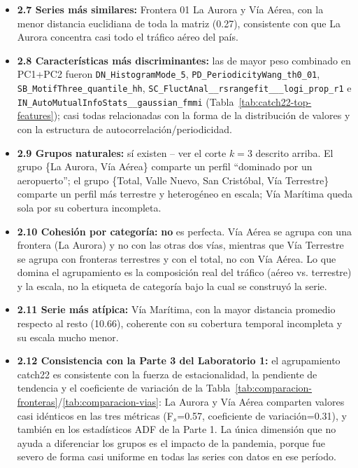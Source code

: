 \documentclass[12pt]{article}
\begin{document}
\begin{itemize}
    \item \textbf{2.7 Series más similares:} Frontera 01 La Aurora y Vía Aérea, con la menor distancia euclidiana de toda la matriz (0.27), consistente con que La Aurora concentra casi todo el tráfico aéreo del país.
    \item \textbf{2.8 Características más discriminantes:} las de mayor peso combinado en PC1+PC2 fueron \texttt{DN\_\allowbreak HistogramMode\_5}, \texttt{PD\_\allowbreak PeriodicityWang\_\allowbreak th0\_01}, \texttt{SB\_\allowbreak MotifThree\_\allowbreak quantile\_hh}, \texttt{SC\_\allowbreak FluctAnal\_\_\allowbreak rsrangefit\_\_\_\allowbreak logi\_\allowbreak prop\_\allowbreak r1} e \texttt{IN\_\allowbreak AutoMutualInfoStats\_\_\allowbreak gaussian\_\allowbreak fmmi} (Tabla~\ref{tab:catch22-top-features}); casi todas relacionadas con la forma de la distribución de valores y con la estructura de autocorrelación/periodicidad.
    \item \textbf{2.9 Grupos naturales:} sí existen -- ver el corte $k=3$ descrito arriba. El grupo \{La Aurora, Vía Aérea\} comparte un perfil ``dominado por un aeropuerto''; el grupo \{Total, Valle Nuevo, San Cristóbal, Vía Terrestre\} comparte un perfil más terrestre y heterogéneo en escala; Vía Marítima queda sola por su cobertura incompleta.
    \item \textbf{2.10 Cohesión por categoría:} \textbf{no} es perfecta. Vía Aérea se agrupa con una frontera (La Aurora) y no con las otras dos vías, mientras que Vía Terrestre se agrupa con fronteras terrestres y con el total, no con Vía Aérea. Lo que domina el agrupamiento es la composición real del tráfico (aéreo vs. terrestre) y la escala, no la etiqueta de categoría bajo la cual se construyó la serie.
    \item \textbf{2.11 Serie más atípica:} Vía Marítima, con la mayor distancia promedio respecto al resto (10.66), coherente con su cobertura temporal incompleta y su escala mucho menor.
    \item \textbf{2.12 Consistencia con la Parte 3 del Laboratorio 1:} el agrupamiento catch22 es consistente con la fuerza de estacionalidad, la pendiente de tendencia y el coeficiente de variación de la Tabla~\ref{tab:comparacion-fronteras}/\ref{tab:comparacion-vias}: La Aurora y Vía Aérea comparten valores casi idénticos en las tres métricas (F$_s$=0.57, coeficiente de variación=0.31), y también en los estadísticos ADF de la Parte 1. La única dimensión que no ayuda a diferenciar los grupos es el impacto de la pandemia, porque fue severo de forma casi uniforme en todas las series con datos en ese período.

\end{itemize}
\end{document}
